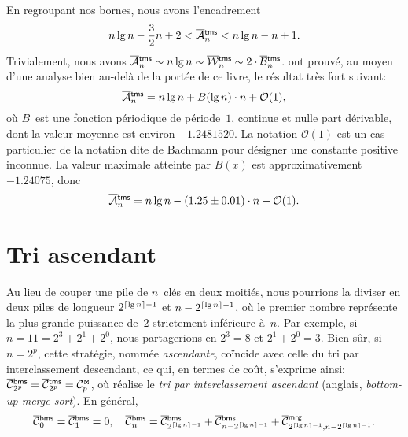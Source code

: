 En regroupant nos bornes, nous avons l'encadrement
\begin{equation*}
n\lg n - \frac{3}{2}n + 2 < \OM{\fun{tms}}{n} < n\lg n - n + 1.
\end{equation*}
Trivialement, nous avons \(\OM{\fun{tms}}{n} \sim n\lg n \sim
\OW{\fun{tms}}{n} \sim 2 \cdot \OB{\fun{tms}}{n}\).
\cite{FlajoletGolin_1994} ont prouvé, au moyen d'une analyse bien
au-delà de la portée de ce livre, le résultat très fort suivant:
\begin{equation*}
\OM{\fun{tms}}{n} = n\lg n + B(\lg n) \cdot n + \mathcal{O}(1),
\end{equation*}
où \(B\)~est une fonction périodique de période~\(1\), continue et
nulle part dérivable, dont la valeur moyenne est environ
\(-1.2481520\). La notation \(\mathcal{O}(1)\) est un cas particulier
de la notation dite de Bachmann pour désigner une constante positive
inconnue. La valeur maximale atteinte par \(B(x)\) est
approximativement \(-1.24075\), donc
\begin{equation*}
\belowdisplayskip=0pt
\OM{\fun{tms}}{n} = n\lg n - (1.25 \pm 0.01) \cdot n + \mathcal{O}(1).
\end{equation*}
  


\section{Tri ascendant}
\label{sec:general_case}

Au lieu de couper une pile de \(n\)~clés en deux moitiés, nous
pourrions la diviser en deux piles de longueur \(2^{\lceil{\lg
    n}\rceil-1}\) et \(n-2^{\lceil{\lg n}\rceil-1}\), où le premier nombre
représente la plus grande puissance de~\(2\) strictement inférieure
à~\(n\). Par exemple, si \(n=11=2^3+2^1+2^0\), nous partagerions en
\(2^3=8\) et \(2^1+2^0=3\). Bien sûr, si \(n=2^p\), cette stratégie,
nommée \emph{ascendante}, coïncide avec celle du tri par
interclassement descendant, ce qui, en termes de coût, s'exprime
ainsi: \(\OC{\fun{bms}}{2^p} = \OC{\fun{tms}}{2^p} = \C{\Join}{p}\),
où  réalise le \emph{tri par
  interclassement ascendant} (anglais, \emph{bottom-up merge
  sort}). En général,
\begin{equation}
\OC{\fun{bms}}{0} = \OC{\fun{bms}}{1} = 0,
\quad
\OC{\fun{bms}}{n} = \OC{\fun{bms}}{2^{\ceiling{\lg n}-1}}
+ \OC{\fun{bms}}{n - 2^{\ceiling{\lg n}-1}}
+ \OC{\fun{mrg}}{2^{\ceiling{\lg n}-1},n - 2^{\ceiling{\lg n}-1}}.
\index{bms@$\OC{\fun{bms}}{n}$}
\label{eq:cost_bms}
\end{equation}

